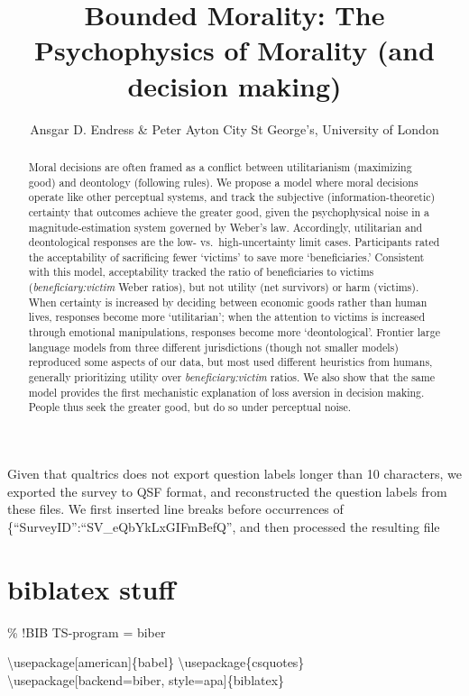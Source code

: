 \documentclass[
]{article}
\title{Bounded Morality: The Psychophysics of Morality (and decision making)}
\author{Ansgar D. Endress \& Peter Ayton
City St George's, University of London}
\date{}
\begin{document}
\maketitle
\begin{abstract}
Moral decisions are often framed as a conflict between utilitarianism (maximizing good) and deontology (following rules). We propose a model where moral decisions operate like other perceptual systems, and track the subjective (information-theoretic) certainty that outcomes achieve the greater good, given the psychophysical noise in a magnitude-estimation system governed by Weber's law. Accordingly, utilitarian and deontological responses are the low- vs.~high-uncertainty limit cases. Participants rated the acceptability of sacrificing fewer `victims' to save more `beneficiaries.' Consistent with this model, acceptability tracked the ratio of beneficiaries to victims (\emph{beneficiary:victim} Weber ratios), but not utility (net survivors) or harm (victims). When certainty is increased by deciding between economic goods rather than human lives, responses become more `utilitarian'; when the attention to victims is increased through emotional manipulations, responses become more `deontological'. Frontier large language models from three different jurisdictions (though not smaller models) reproduced some aspects of our data, but most used different heuristics from humans, generally prioritizing utility over \emph{beneficiary:victim} ratios. We also show that the same model provides the first mechanistic explanation of loss aversion in decision making. People thus seek the greater good, but do so under perceptual noise.
\end{abstract}

Given that qualtrics does not export question labels longer than 10 characters, we exported the survey to QSF format, and reconstructed the question labels from these files. We first inserted line breaks before occurrences of \{``SurveyID'':``SV\_eQbYkLxGIFmBefQ'', and then processed the resulting file

\section{biblatex stuff}\label{biblatex-stuff}

\% !BIB TS-program = biber

\textbackslash usepackage{[}american{]}\{babel\}
\textbackslash usepackage\{csquotes\}
\textbackslash usepackage{[}backend=biber, style=apa{]}\{biblatex\}
\end{document}
